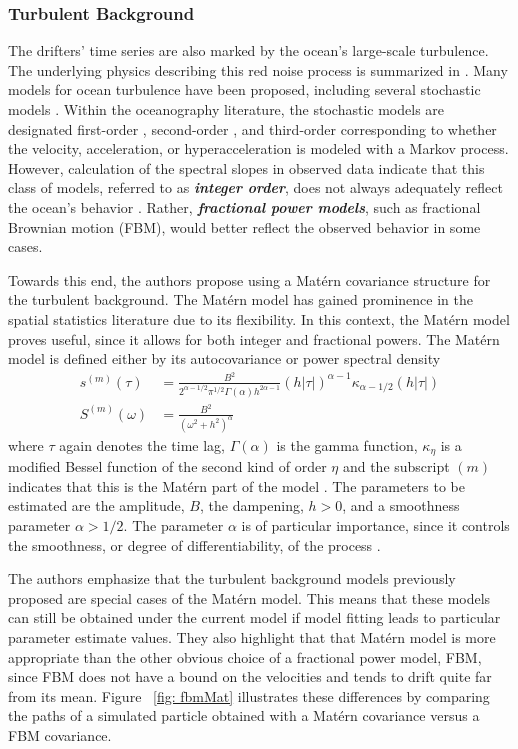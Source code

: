 \documentclass{stat572Style}
\begin{document}
\subsubsection{Turbulent Background}
The drifters' time series are also marked by the ocean's large-scale turbulence. 
The underlying physics describing this red noise process is summarized in \citet{Rhines1979}. 
Many models for ocean turbulence have been proposed, including several stochastic models \citep{Lacasce2008}. 
Within the oceanography literature, the stochastic models are designated  first-order \citep{Griffa1995, Falco2000}, second-order \citep{Sawford1991}, and third-order corresponding to  whether the velocity, acceleration, or hyperacceleration is modeled with a Markov process. 
However, calculation of the spectral slopes in observed data indicate that this class of models, referred to as \textbf{\it{integer order}},  does not always adequately reflect the ocean's behavior \citep{Rupolo1996, Sanderson1991}. Rather, \textbf{\it{fractional power models}}, such as fractional Brownian motion (FBM), would better reflect the observed behavior in some cases.

Towards this end, the authors propose using a Mat\'{e}rn covariance structure \citep{Gneiting2012} for the turbulent background. 
The Mat\'{e}rn model has gained prominence in the spatial statistics literature due to its flexibility.
 In this context, the Mat\'{e}rn model proves useful, since it allows for both integer and fractional powers. 
 The Mat\'{e}rn model is defined either by its autocovariance or power spectral density
\begin{align}
\label{eq:maternAC}
s^{(m)}(\tau) &= \frac{B^{2}}{2^{\alpha - 1/2}\pi^{1/2} \Gamma(\alpha) h^{2 \alpha - 1}}(h|\tau|)^{\alpha - 1}\kappa_{\alpha - 1/2}(h|\tau|)\\
\label{eq:maternPSD}
S^{(m)}(\omega) &= \frac{B^{2}}{(\omega^{2} + h^{2})^{\alpha}}
\end{align}
where $\tau$ again denotes the time lag, $\Gamma(\alpha)$ is the gamma function,  $\kappa_{\eta}$ is a modified Bessel function of the second kind of order $\eta$  and the subscript $(m)$ indicates that this is the Mat\'{e}rn part of the model \citep{Stein2012}. 
The parameters to be estimated are the amplitude, $B$, the dampening, $h > 0$, and a smoothness parameter $\alpha > 1/2$.
 The parameter $\alpha$ is of particular importance, since it controls the smoothness, or degree of differentiability, of the process \citep{Fuentes2010}. 

The authors emphasize that the turbulent background models previously proposed are special cases of the Mat\'{e}rn model. 
This means that these models can still be obtained under the current model if model fitting leads to particular parameter estimate values. 
They also highlight that that Mat\'{e}rn model is more appropriate than the other obvious choice of a fractional power model, FBM, since FBM does not have a bound on the velocities and tends to drift quite far from its mean.
 Figure ~\ref{fig: fbmMat} illustrates these differences by comparing the paths of a simulated particle obtained with a Mat\'{e}rn  covariance versus a FBM covariance. 
\end{document}
